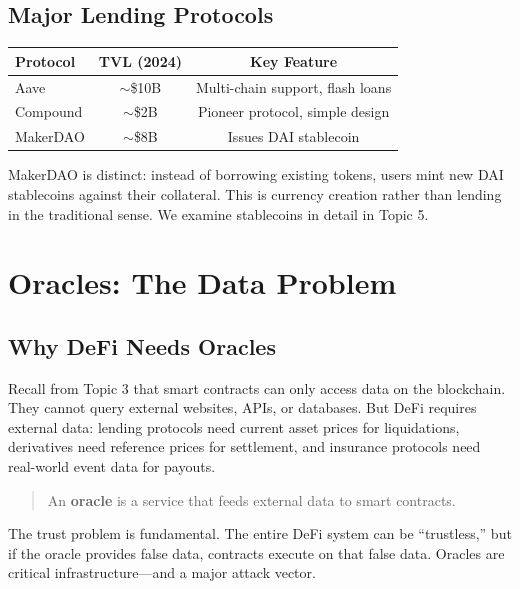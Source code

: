 \documentclass[11pt,a4paper]{article}
\newcommand{\keyword}[1]{\textbf{\textcolor{AccentOrange}{#1}}}
\begin{document}
\subsection{Major Lending Protocols}

\begin{center}
\begin{tabular}{lcc}
\toprule
\textbf{Protocol} & \textbf{TVL (2024)} & \textbf{Key Feature} \\
\midrule
Aave & $\sim$\$10B & Multi-chain support, flash loans \\
Compound & $\sim$\$2B & Pioneer protocol, simple design \\
MakerDAO & $\sim$\$8B & Issues DAI stablecoin \\
\bottomrule
\end{tabular}
\end{center}

MakerDAO is distinct: instead of borrowing existing tokens, users mint new DAI stablecoins against their collateral. This is currency creation rather than lending in the traditional sense. We examine stablecoins in detail in Topic 5.

\section{Oracles: The Data Problem}

\subsection{Why DeFi Needs Oracles}

Recall from Topic 3 that smart contracts can only access data on the blockchain. They cannot query external websites, APIs, or databases. But DeFi requires external data: lending protocols need current asset prices for liquidations, derivatives need reference prices for settlement, and insurance protocols need real-world event data for payouts.

\begin{quote}
An \keyword{oracle} is a service that feeds external data to smart contracts.
\end{quote}

The trust problem is fundamental. The entire DeFi system can be ``trustless,'' but if the oracle provides false data, contracts execute on that false data. Oracles are critical infrastructure---and a major attack vector.
\end{document}
